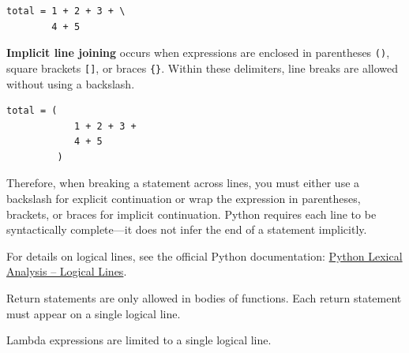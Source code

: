\begin{lstlisting}
total = 1 + 2 + 3 + \
        4 + 5
\end{lstlisting}

\textbf{Implicit line joining} occurs when expressions are enclosed in 
parentheses \texttt{()}, square brackets \texttt{[]}, or braces \texttt{\{\}}. 
Within these delimiters, line breaks are allowed without using a backslash.

\begin{lstlisting}
total = (
            1 + 2 + 3 +
            4 + 5
         )
\end{lstlisting}

Therefore, when breaking a statement across lines, you must either use a backslash for explicit continuation or wrap the expression in parentheses, brackets, or braces for implicit continuation. Python requires each line to be syntactically complete—it does not infer the end of a statement implicitly.

For details on logical lines, see the official Python documentation:
\href{https://docs.python.org/3/reference/lexical_analysis.html#logical-lines}{Python Lexical Analysis – Logical Lines}.

\item Return statements are only allowed in bodies of functions. Each return statement must appear on a single logical line.
\item Lambda expressions are limited to a single logical line.
